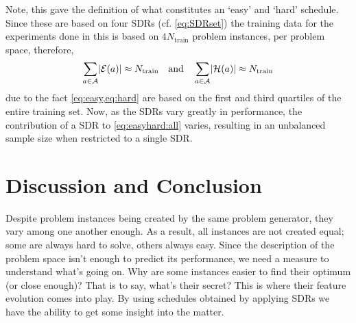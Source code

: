 Note, this  gave the definition of what 
constitutes an `easy' and `hard' schedule. Since these are based on four SDRs 
(cf. \cref{eq:SDRset}) the training data for the experiments done in this 
 is based on $4N_{\text{train}}$ problem 
instances, per problem space, therefore,
\begin{equation}\label{eq:easyhard:all}
  \sum_{a\in\mathcal{A}}\abs{\mathcal{E}(a)} \approx N_{\text{train}}
  \quad\text{and}\quad
  \sum_{a\in\mathcal{A}}\abs{\mathcal{H}(a)} \approx N_{\text{train}}
\end{equation} 
due to the fact \cref{eq:easy,eq:hard} are based on the first and third 
quartiles of the entire training set.
Now, as the SDRs vary greatly in performance, the contribution of a SDR to \cref{eq:easyhard:all} varies, resulting in an unbalanced sample size when restricted to a single SDR. 



\section{Discussion and Conclusion}
Despite problem instances being created by the same problem generator, they vary among one another enough. As a result, all instances are not created equal; some are always hard to solve, others always easy. 
Since the description of the problem space isn't enough to predict its performance, we need a measure to understand what's going on. Why are some instances easier to find their optimum (or close enough)? That is to say, what's their secret? This is where their feature evolution comes into play.
By using schedules obtained by applying SDRs we have the ability to get some insight into the matter. 


